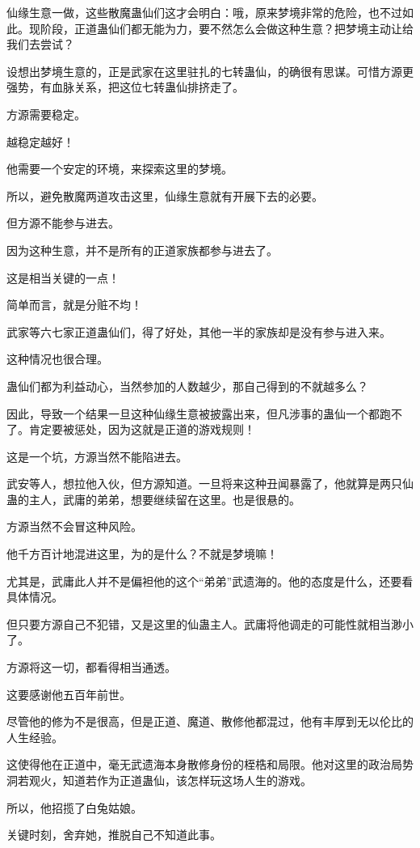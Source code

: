 \begin{this_body}
仙缘生意一做，这些散魔蛊仙们这才会明白：哦，原来梦境非常的危险，也不过如此。现阶段，正道蛊仙们都无能为力，要不然怎么会做这种生意？把梦境主动让给我们去尝试？

设想出梦境生意的，正是武家在这里驻扎的七转蛊仙，的确很有思谋。可惜方源更强势，有血脉关系，把这位七转蛊仙排挤走了。

方源需要稳定。

越稳定越好！

他需要一个安定的环境，来探索这里的梦境。

所以，避免散魔两道攻击这里，仙缘生意就有开展下去的必要。

但方源不能参与进去。

因为这种生意，并不是所有的正道家族都参与进去了。

这是相当关键的一点！

简单而言，就是分赃不均！

武家等六七家正道蛊仙们，得了好处，其他一半的家族却是没有参与进入来。

这种情况也很合理。

蛊仙们都为利益动心，当然参加的人数越少，那自己得到的不就越多么？

因此，导致一个结果一旦这种仙缘生意被披露出来，但凡涉事的蛊仙一个都跑不了。肯定要被惩处，因为这就是正道的游戏规则！

这是一个坑，方源当然不能陷进去。

武安等人，想拉他入伙，但方源知道。一旦将来这种丑闻暴露了，他就算是两只仙蛊的主人，武庸的弟弟，想要继续留在这里。也是很悬的。

方源当然不会冒这种风险。

他千方百计地混进这里，为的是什么？不就是梦境嘛！

尤其是，武庸此人并不是偏袒他的这个“弟弟”武遗海的。他的态度是什么，还要看具体情况。

但只要方源自己不犯错，又是这里的仙蛊主人。武庸将他调走的可能性就相当渺小了。

方源将这一切，都看得相当通透。

这要感谢他五百年前世。

尽管他的修为不是很高，但是正道、魔道、散修他都混过，他有丰厚到无以伦比的人生经验。

这使得他在正道中，毫无武遗海本身散修身份的桎梏和局限。他对这里的政治局势洞若观火，知道若作为正道蛊仙，该怎样玩这场人生的游戏。

所以，他招揽了白兔姑娘。

关键时刻，舍弃她，推脱自己不知道此事。


\end{this_body}
